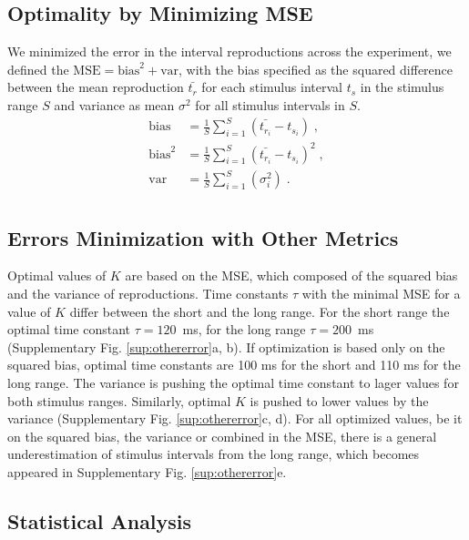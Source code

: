 \documentclass[10pt]{article}
\begin{document}
\subsection*{Optimality by Minimizing MSE}
We minimized the error in the interval reproductions across the experiment, we defined the $\text{MSE} = \text{bias}^2+\text{var}$, with the bias specified as the squared difference between the mean reproduction $\bar{t_{r}}$ for each stimulus interval $t_s$ in the stimulus range $S$ and variance as mean $\sigma^2$ for all stimulus intervals in $S$.
\begin{equation} \label{MSE}
	\begin{split}
	 \text{bias} & = \frac{1}{S} \sum \limits_{i=1}^{S} (\bar{t_{r_i}} - t_{s_i}) \;,\\
	 \text{bias}^2 & = \frac{1}{S} \sum \limits_{i=1}^{S}(\bar{t_{r_i}} - t_{s_i})^2 \;,\\
	 \text{var} & = \frac{1}{S} \sum \limits_{i=1}^{S}(\sigma_i^2) \;.\\
	\end{split}
\end{equation}

\subsection*{Errors Minimization with Other Metrics}
Optimal values of $K$ are based on the MSE, which composed of the squared bias and the variance of reproductions. 
Time constants $\tau$ with the minimal MSE for a value of $K$ differ between the short and the long range. For the short range the optimal time constant $\tau = 120$~ms, for the long range $\tau = 200$~ms (Supplementary Fig. \ref{sup:othererror}a, b). If optimization is based only on the squared bias, optimal time constants are 100 ms for the short and 110 ms for the long range. 
The variance is pushing the optimal time constant to lager values for both stimulus ranges. 
Similarly, optimal $K$ is pushed to lower values by the variance (Supplementary Fig. \ref{sup:othererror}c, d).
For all optimized values, be it on the squared bias, the variance or combined in the MSE, there is a general underestimation of stimulus intervals from the long range, which becomes appeared in Supplementary Fig. \ref{sup:othererror}e.

\subsection*{Statistical Analysis}
\end{document}
